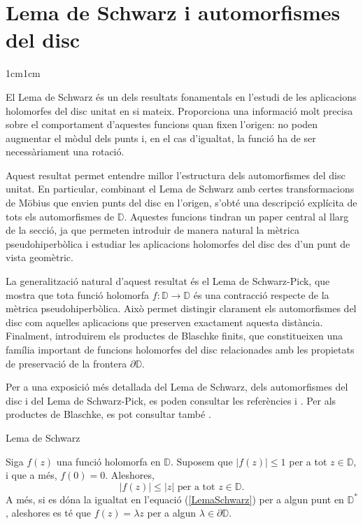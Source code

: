 \section{Lema de Schwarz i automorfismes del disc}

\begin{adjustwidth}{1cm}{1cm}

El Lema de Schwarz és un dels resultats fonamentals en l'estudi de les aplicacions holomorfes del disc unitat en si mateix. Proporciona una informació molt precisa sobre el comportament d'aquestes funcions quan fixen l'origen: no poden augmentar el mòdul dels punts i, en el cas d'igualtat, la funció ha de ser necessàriament una rotació.

Aquest resultat permet entendre millor l'estructura dels automorfismes del disc unitat. En particular, combinant el Lema de Schwarz amb certes transformacions de Möbius que envien punts del disc en l'origen, s'obté una descripció explícita de tots els automorfismes de $\mathbb{D}$. Aquestes funcions tindran un paper central al llarg de la secció, ja que permeten introduir de manera natural la mètrica pseudohiperbòlica i estudiar les aplicacions holomorfes del disc des d'un punt de vista geomètric.

La generalització natural d'aquest resultat és el Lema de Schwarz-Pick, que mostra que tota funció holomorfa $f : \mathbb{D} \to \mathbb{D}$ és una contracció respecte de la mètrica pseudohiperbòlica. Això permet distingir clarament els automorfismes del disc com aquelles aplicacions que preserven exactament aquesta distància. Finalment, introduirem els productes de Blaschke finits, que constitueixen una família important de funcions holomorfes del disc relacionades amb les propietats de preservació de la frontera $\partial \mathbb{D}$.

Per a una exposició més detallada del Lema de Schwarz, dels automorfismes del disc i del Lema de Schwarz-Pick, es poden consultar les referències \cite[Cap. IX]{gamelin} i \cite[Cap. 4]{shapiro}. Per als productes de Blaschke, es pot consultar també \cite[Cap. 15]{rudin}.

\begin{subsection}{Lema de Schwarz}

\begin{lema}[Schwarz]
    Siga $f(z)$ una funció holomorfa en $\mathbb{D}$. Suposem que $|f(z)|\leq 1$ per a tot $z\in\mathbb{D}$, i que a més, $f(0)=0$. Aleshores, 
    \begin{equation}
        |f(z)|\leq |z| \text{ per a tot } z\in\mathbb{D}.
        \label{LemaSchwarz}
    \end{equation} 
    A més, si es dóna la igualtat en l'equació (\ref{LemaSchwarz}) per a algun punt en $\mathbb{D}^*$, aleshores es té que $f(z)=\lambda z$ per a algun $\lambda \in \partial \mathbb{D}$. 
\end{lema}


\end{subsection}
\end{adjustwidth}
